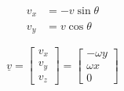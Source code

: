 
\begin{equation*}
  \begin{split}
    v_{x}&=-v\sin{\theta} \\
    v_{y}&=v\cos{\theta}
  \end{split}
\end{equation*}

\begin{equation*}
  \underline{v}=
  \begin{bmatrix}
    v_{x} \\
    v_{y} \\
    v_{z}
  \end{bmatrix}=
  \begin{bmatrix}
    -\omega y \\
    \omega x \\
    0
  \end{bmatrix}
\end{equation*}

